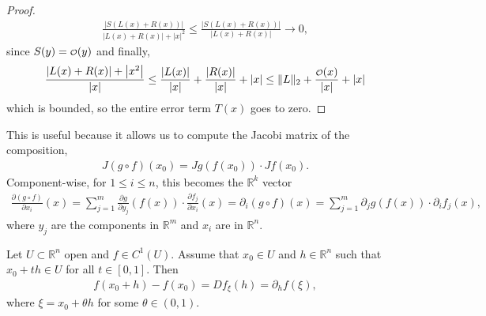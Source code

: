 \begin{proof}
	\begin{align*}
		\frac{\left| S(L(x) + R(x)) \right|}{ \left| L(x) + R(x) \right| + \left| x \right|^{2}} \leq \frac{\left| S(L(x) + R(x)) \right|}{ \left| L(x) + R(x) \right|} \to 0,
	\end{align*}
	since $S(y) = \smalO(y)$ and finally,
	\begin{align*}
		\frac{\left| L(x) + R(x) \right| + \left| x^{2} \right|}{\left| x \right|} \leq \frac{\left| L(x) \right|}{\left| x \right|} + \frac{\left| R(x) \right|}{\left| x \right|} + \left| x \right| \leq \lVert L \rVert_{2} + \frac{\smalO(x)}{\left| x \right|} + \left| x \right|
	\end{align*}
	which is bounded, so the entire error term $T(x)$ goes to zero.
\end{proof}

\begin{remark}\label{rem:chain-rule-comp}
	This is useful because it allows us to compute the Jacobi matrix of the composition,
	\begin{align*}
		J(g \circ f)(x_{0}) = Jg(f(x_{0})) \cdot Jf(x_{0}).
	\end{align*}
	Component-wise, for $1 \leq i \leq n$, this becomes the $\mathbb{R}^{k}$ vector
	\begin{align*}
		\frac{\partial (g \circ f)}{\partial x_{i}}(x) = \sum_{j=1}^{m} \frac{\partial g}{\partial y_{j}} (f(x)) \cdot \frac{\partial f_{j}}{\partial x_{i}}(x) = \partial_{i}(g \circ f)(x) = \sum_{j=1}^{m} \partial_{j}g(f(x)) \cdot \partial_{i}f_{j}(x),
	\end{align*}
	where $y_{j}$ are the components in $\mathbb{R}^{m}$ and $x_{i}$ are in $\mathbb{R}^{n}$.
\end{remark}

\newpage

\begin{theorem}\label{thm:MVT}
	Let $U \subset \mathbb{R}^{n}$ open and $f \in C^{1}(U)$. Assume that $x_{0} \in U$ and $h \in \mathbb{R}^{n}$ such that $x_{0} + th \in U$ for all $t \in [0,1]$. Then
	\begin{align*}
		f(x_{0} + h) - f(x_{0}) = D f_{\xi}(h) = \partial_{h}f(\xi),
	\end{align*}
	where $\xi = x_{0} + \theta h$ for some $\theta \in (0,1)$.
\end{theorem}


